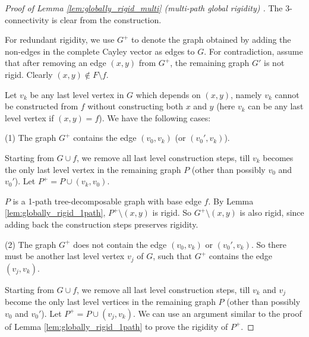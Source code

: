 \documentclass[secthm,amsthm,english]{article}
\theoremstyle{definition}
\theoremstyle{remark}
\begin{document}
\begin{proof}[Proof of Lemma \ref{lem:globally_rigid_multi} (multi-path global rigidity) ]
The 3-connectivity is clear from the construction. 

For redundant rigidity, 
we use $G^+$ to denote the graph obtained by adding the non-edges
in  the complete Cayley vector as edges to $G$. 
For contradiction, assume that after removing an edge $(x,y)$ from $G^+$, 
the remaining graph $G'$ is not rigid. 
Clearly $(x,y) \notin F \setminus f$.


Let $v_k$ be any last level vertex in $G$ which depends on $(x,y)$, 
namely $v_k$ cannot be constructed from $f$
without constructing both $x$ and $y$ (here $v_k$ can be any last level vertex if $(x,y) = f$).
We have the following cases:


\noindent (1) The graph $G^+$ contains the edge $(v_0,v_k)$ (or $(v_0',v_k)$). 

Starting from $G \cup f$, 
we remove all last level construction steps, till
$v_k$ becomes the only last level vertex in the remaining graph $P$
(other than possibly $v_0$ and $v_0'$).
Let $P^+ = P \cup (v_k,v_0)$. 

$P$ is a 1-path tree-decomposable graph with base edge $f$. 
By Lemma \ref{lem:globally_rigid_1path}, $P^+ \setminus (x,y)$ is rigid. 
So $G^+ \setminus (x,y)$ is also rigid, since adding back the construction steps preserves rigidity. 


\noindent (2) The graph $G^+$ does not contain the edge $(v_0,v_k)$ or $(v_0',v_k)$. 
So there must be another last level vertex $v_j$ of $G$, such that $G^+$ contains the edge $(v_j,v_k)$.

Starting from $G \cup f$, 
we remove all last level construction steps, till
$v_k$ and $v_j$ become the only last level vertices in the remaining graph $P$
(other than possibly $v_0$ and $v_0'$). 
Let $P^+ = P \cup (v_j,v_k)$. 
We can use an argument similar to the proof of Lemma \ref{lem:globally_rigid_1path} to 
prove the rigidity of $P^+$.
\end{proof}
\end{document}
